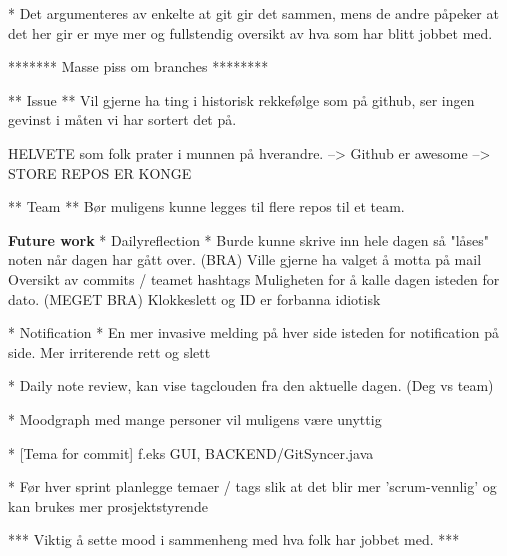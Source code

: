 * Det argumenteres av enkelte at git gir det sammen, mens de andre påpeker at det her gir er mye mer og fullstendig oversikt av hva som har blitt jobbet med.



******* Masse piss om branches ********

** Issue **
Vil gjerne ha ting i historisk rekkefølge som på github, ser ingen gevinst i måten vi har sortert det på.

HELVETE som folk prater i munnen på hverandre.
--> Github er awesome --> STORE REPOS ER KONGE

** Team **
Bør muligens kunne legges til flere repos til et team.


\textbf{Future work}
* Dailyreflection *
	Burde kunne skrive inn hele dagen så "låses" noten når dagen har gått over. (BRA)
	Ville gjerne ha valget å motta på mail
	Oversikt av commits / teamet hashtags
	Muligheten for å kalle dagen isteden for dato. (MEGET BRA)
	Klokkeslett og ID er forbanna idiotisk

	* Notification *
		En mer invasive melding på hver side isteden for notification på side.
			Mer irriterende rett og slett

* Daily note review, kan vise tagclouden fra den aktuelle dagen. (Deg vs team)
	

* Moodgraph med mange personer vil muligens være unyttig


* [Tema for commit] f.eks GUI, BACKEND/GitSyncer.java


* Før hver sprint planlegge temaer / tags slik at det blir mer 'scrum-vennlig' og kan brukes mer prosjektstyrende

*** Viktig å sette mood i sammenheng med hva folk har jobbet med. *** 